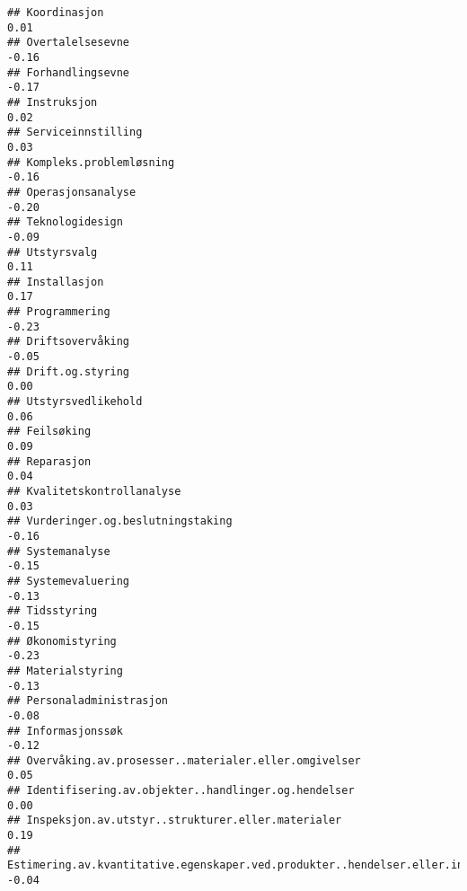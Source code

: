 \documentclass[
]{article}
\begin{document}
\begin{verbatim}
## Koordinasjon                                                                      0.01
## Overtalelsesevne                                                                 -0.16
## Forhandlingsevne                                                                 -0.17
## Instruksjon                                                                       0.02
## Serviceinnstilling                                                                0.03
## Kompleks.problemløsning                                                          -0.16
## Operasjonsanalyse                                                                -0.20
## Teknologidesign                                                                  -0.09
## Utstyrsvalg                                                                       0.11
## Installasjon                                                                      0.17
## Programmering                                                                    -0.23
## Driftsovervåking                                                                 -0.05
## Drift.og.styring                                                                  0.00
## Utstyrsvedlikehold                                                                0.06
## Feilsøking                                                                        0.09
## Reparasjon                                                                        0.04
## Kvalitetskontrollanalyse                                                          0.03
## Vurderinger.og.beslutningstaking                                                 -0.16
## Systemanalyse                                                                    -0.15
## Systemevaluering                                                                 -0.13
## Tidsstyring                                                                      -0.15
## Økonomistyring                                                                   -0.23
## Materialstyring                                                                  -0.13
## Personaladministrasjon                                                           -0.08
## Informasjonssøk                                                                  -0.12
## Overvåking.av.prosesser..materialer.eller.omgivelser                              0.05
## Identifisering.av.objekter..handlinger.og.hendelser                               0.00
## Inspeksjon.av.utstyr..strukturer.eller.materialer                                 0.19
## Estimering.av.kvantitative.egenskaper.ved.produkter..hendelser.eller.informasjon -0.04

\end{verbatim}
\end{document}
